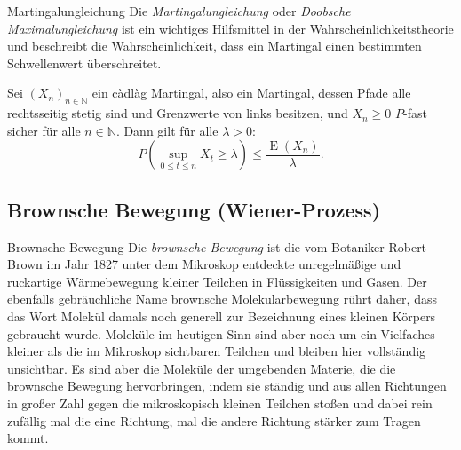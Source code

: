\begin{theo}{Martingalungleichung}
    Die \emph{Martingalungleichung} oder \emph{Doobsche Maximalungleichung} ist ein wichtiges Hilfsmittel in der Wahrscheinlichkeitstheorie und beschreibt die Wahrscheinlichkeit, dass ein Martingal einen bestimmten Schwellenwert überschreitet.

    Sei $(X_{n})_{n\in \mathbb{N}}$ ein càdlàg Martingal, also ein Martingal, dessen Pfade alle rechtsseitig stetig sind und Grenzwerte von links besitzen, und $X_{n} \geq 0$ $P$-fast sicher für alle $n\in \mathbb{N}$.
    Dann gilt für alle $\lambda > 0$:
    \[
        P\left(\sup_{0\leq t\leq n}X_{t}\geq \lambda \right)\leq{\frac{\operatorname{E}(X_{n})}{\lambda }}.
    \]
\end{theo}

\subsection{Brownsche Bewegung (Wiener-Prozess)}

\begin{bonus}{Brownsche Bewegung}
    Die \emph{brownsche Bewegung} ist die vom Botaniker Robert Brown im Jahr 1827 unter dem Mikroskop entdeckte unregelmäßige und ruckartige Wärmebewegung kleiner Teilchen in Flüssigkeiten und Gasen.
    Der ebenfalls gebräuchliche Name brownsche Molekularbewegung rührt daher, dass das Wort Molekül damals noch generell zur Bezeichnung eines kleinen Körpers gebraucht wurde.
    Moleküle im heutigen Sinn sind aber noch um ein Vielfaches kleiner als die im Mikroskop sichtbaren Teilchen und bleiben hier vollständig unsichtbar.
    Es sind aber die Moleküle der umgebenden Materie, die die brownsche Bewegung hervorbringen, indem sie ständig und aus allen Richtungen in großer Zahl gegen die mikroskopisch kleinen Teilchen stoßen und dabei rein zufällig mal die eine Richtung, mal die andere Richtung stärker zum Tragen kommt.
\end{bonus}

